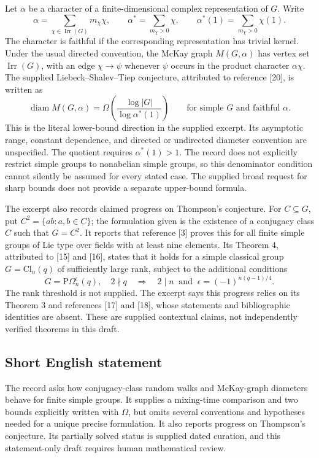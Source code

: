 \documentclass[11pt]{article}
\begin{document}
Let \(\alpha\) be a character of a finite-dimensional complex representation of \(G\). Write
\[
 \alpha=\sum_{\chi\in\operatorname{Irr}(G)}m_\chi\chi,
 \qquad
 \alpha^*=\sum_{m_\chi>0}\chi,
 \qquad
 \alpha^*(1)=\sum_{m_\chi>0}\chi(1).
\]
The character is faithful if the corresponding representation has trivial kernel. Under the usual directed convention, the McKay graph \(M(G,\alpha)\) has vertex set \(\operatorname{Irr}(G)\), with an edge \(\chi\to\psi\) whenever \(\psi\) occurs in the product character \(\alpha\chi\). The supplied Liebeck--Shalev--Tiep conjecture, attributed to reference [20], is written as
\[
 \operatorname{diam}M(G,\alpha)
 =\Omega\!\left(\frac{\log|G|}{\log\alpha^*(1)}\right)
 \qquad
 \text{for simple }G\text{ and faithful }\alpha.
\]
This is the literal lower-bound direction in the supplied excerpt. Its asymptotic range, constant dependence, and directed or undirected diameter convention are unspecified. The quotient requires \(\alpha^*(1)>1\). The record does not explicitly restrict simple groups to nonabelian simple groups, so this denominator condition cannot silently be assumed for every stated case. The supplied broad request for sharp bounds does not provide a separate upper-bound formula.

The excerpt also records claimed progress on Thompson's conjecture. For \(C\subseteq G\), put \(C^2=\{ab:a,b\in C\}\); the formulation given is the existence of a conjugacy class \(C\) such that \(G=C^2\). It reports that reference [3] proves this for all finite simple groups of Lie type over fields with at least nine elements. Its Theorem 4, attributed to [15] and [16], states that it holds for a simple classical group \(G=\mathrm{Cl}_n(q)\) of sufficiently large rank, subject to the additional conditions
\[
 G=\mathrm{P}\Omega_n^{\epsilon}(q),\quad 2\nmid q
 \quad\Longrightarrow\quad
 2\mid n\ \text{ and }\ \epsilon=(-1)^{n(q-1)/4}.
\]
The rank threshold is not supplied. The excerpt says this progress relies on its Theorem 3 and references [17] and [18], whose statements and bibliographic identities are absent. These are supplied contextual claims, not independently verified theorems in this draft.
\subsection{Short English statement}
The record asks how conjugacy-class random walks and McKay-graph diameters behave for finite simple groups. It supplies a mixing-time comparison and two bounds explicitly written with \(\Omega\), but omits several conventions and hypotheses needed for a unique precise formulation. It also reports progress on Thompson's conjecture. Its partially solved status is supplied dated curation, and this statement-only draft requires human mathematical review.
\end{document}
